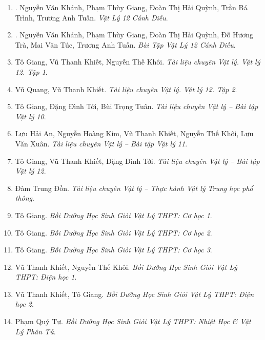 \documentclass{article}
\begin{document}
\begin{enumerate}
	\item \cite{SGK_Vat_Ly_12_CD}. {\sc Nguyễn Văn Khánh, Phạm Thùy Giang, Đoàn Thị Hải Quỳnh, Trần Bá Trình, Trương Anh Tuấn}. {\it Vật Lý 12 Cánh Diều}.\hfill{\sf[done]}
	
	\item \cite{SBT_Vat_Ly_12_CD}. {\sc Nguyễn Văn Khánh, Phạm Thùy Giang, Đoàn Thị Hải Quỳnh, Đỗ Hương Trà, Mai Văn Túc, Trương Anh Tuấn}. {\it Bài Tập Vật Lý 12 Cánh Diều}.\hfill{\sf[done]}
	
	\item Tô Giang, Vũ Thanh Khiết, Nguyễn Thế Khôi. {\it Tài liệu chuyên Vật lý. Vật lý 12. Tập 1}.
	
	\item Vũ Quang, Vũ Thanh Khiết. {\it Tài liệu chuyên Vật lý. Vật lý 12. Tập 2}.
	
	\item Tô Giang, Đặng Đình Tới, Bùi Trọng Tuân. {\it Tài liệu chuyên Vật lý -- Bài tập Vật lý 10}.
	
	\item Lưu Hải An, Nguyễn Hoàng Kim, Vũ Thanh Khiết, Nguyễn Thế Khôi, Lưu Văn Xuân. {\it Tài liệu chuyên Vật lý -- Bài tập Vật lý 11}.
	
	\item Tô Giang, Vũ Thanh Khiết, Đặng Đình Tới. {\it Tài liệu chuyên Vật lý -- Bài tập Vật lý 12}.
	
	\item Đàm Trung Đồn. {\it Tài liệu chuyên Vật lý -- Thực hành Vật lý Trung học phổ thông}.
	
	\item Tô Giang. {\it Bồi Dưỡng Học Sinh Giỏi Vật Lý THPT: Cơ học 1}.\hfill{\sf[reading]}
	
	\item Tô Giang. {\it Bồi Dưỡng Học Sinh Giỏi Vật Lý THPT: Cơ học 2}.\hfill{\sf[reading]}
	
	\item Tô Giang. {\it Bồi Dưỡng Học Sinh Giỏi Vật Lý THPT: Cơ học 3}.\hfill{\sf[reading]}
	
	\item Vũ Thanh Khiết, Nguyễn Thế Khôi. {\it Bồi Dưỡng Học Sinh Giỏi Vật Lý THPT: Điện học 1}.\hfill{\sf[reading]}
	
	\item Vũ Thanh Khiết, Tô Giang. {\it Bồi Dưỡng Học Sinh Giỏi Vật Lý THPT: Điện học 2}.\hfill{\sf[reading]}
	
	\item Phạm Quý Tư. {\it Bồi Dưỡng Học Sinh Giỏi Vật Lý THPT: Nhiệt Học \& Vật Lý Phân Tử}.
	

\end{enumerate}
\end{document}
